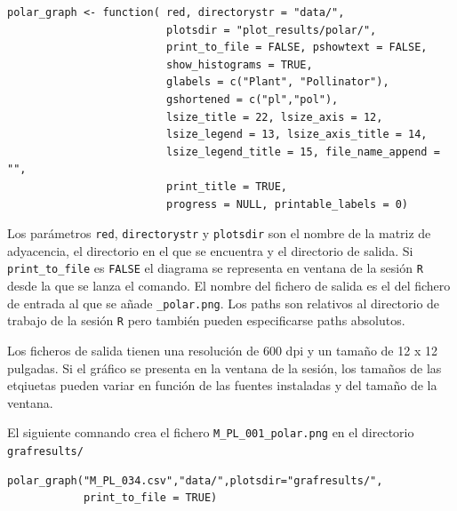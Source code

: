 \fontsize{3.5mm}{3.5mm}\selectfont
\begin{verbatim}
polar_graph <- function( red, directorystr = "data/", 
                         plotsdir = "plot_results/polar/", 
                         print_to_file = FALSE, pshowtext = FALSE,
                         show_histograms = TRUE, 
                         glabels = c("Plant", "Pollinator"),
                         gshortened = c("pl","pol"),
                         lsize_title = 22, lsize_axis = 12, 
                         lsize_legend = 13, lsize_axis_title = 14, 
                         lsize_legend_title = 15, file_name_append = "",
                         print_title = TRUE,
                         progress = NULL, printable_labels = 0)
\end{verbatim}
\normalsize

Los parámetros \texttt{red}, \texttt{directorystr} y \texttt{plotsdir} son el nombre de la matriz de adyacencia, el directorio en el que se encuentra y el directorio de salida. Si \texttt{print\_to\_file} es \texttt{FALSE} el diagrama se representa en ventana de la sesión \texttt{R} desde la que se lanza el comando. El nombre del fichero de salida es el del fichero de entrada al que se añade \texttt{\_polar.png}. Los paths son relativos al directorio de trabajo de la sesión \texttt{R} pero también pueden especificarse paths absolutos.

Los ficheros de salida tienen una resolución de 600 dpi y un tamaño de 12 x 12 pulgadas. Si el gráfico se presenta en la ventana de la sesión, los tamaños de las etqiuetas pueden variar en función de las fuentes instaladas y del tamaño de la ventana.

El siguiente comnando crea el fichero \texttt{M\_PL\_001\_polar.png} en el directorio \texttt{grafresults/}

\fontsize{3.5mm}{3.5mm}\selectfont
\begin{verbatim}
polar_graph("M_PL_034.csv","data/",plotsdir="grafresults/",
            print_to_file = TRUE)
\end{verbatim}
\normalsize

